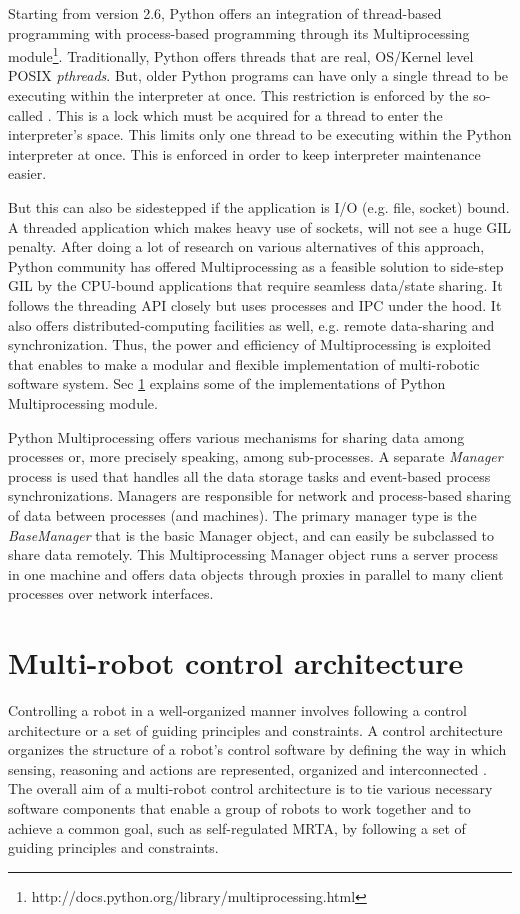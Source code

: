 Starting from version 2.6, Python offers an integration of thread-based programming with process-based programming through its Multiprocessing module\footnote{http://docs.python.org/library/multiprocessing.html}. Traditionally, Python offers threads that are real, OS/Kernel level POSIX {\em pthreads}.  But, older Python programs can have only a single thread to be executing within the interpreter at once. This restriction is enforced by the so-called . This is a lock which must be
 acquired for a thread to enter the interpreter's space.
 This limits only one thread to  be executing within the Python interpreter at once.  This is enforced  in order to keep interpreter maintenance easier.
 
But this can also be sidestepped if the application is I/O (e.g. file, socket) bound. A threaded application which makes heavy use of sockets, will not see a huge GIL penalty.  After  doing a lot of research on various alternatives of this approach, Python community has offered Multiprocessing as a feasible solution to side-step GIL by the CPU-bound applications that  require seamless data/state sharing.   It follows the threading API closely but uses processes and IPC under the hood. It also offers distributed-computing facilities as well, e.g. remote data-sharing and synchronization.  Thus, the power and efficiency of Multiprocessing is exploited that enables to make a modular and flexible implementation of multi-robotic software system. Sec \ref{expt-tools:arch} explains some of the implementations of Python Multiprocessing module.
 
Python Multiprocessing offers various mechanisms for sharing data among processes or, more precisely speaking, among sub-processes. A separate {\em Manager} process is used that handles all the data storage tasks and event-based process synchronizations.  Managers are responsible for network and process-based sharing of data between processes (and machines).
 The primary manager type is the {\em BaseManager} that is the basic Manager object, and can easily be subclassed to share
 data remotely.  This Multiprocessing Manager object runs a server process in one machine and offers data objects through proxies in parallel to many client  processes over network interfaces.
\section{Multi-robot control architecture}
\label{expt-tools:arch}
Controlling a robot in a well-organized manner involves following a control architecture or a set of guiding principles and constraints. A control architecture organizes the structure  of a robot's control software by defining the way in which sensing, reasoning and actions are represented, organized and interconnected \cite{Bekey2005}. The overall aim of a multi-robot control architecture is to tie various necessary software components that enable a group of robots to work together and to achieve a common goal, such as self-regulated MRTA, by following a set of guiding principles and constraints. 

